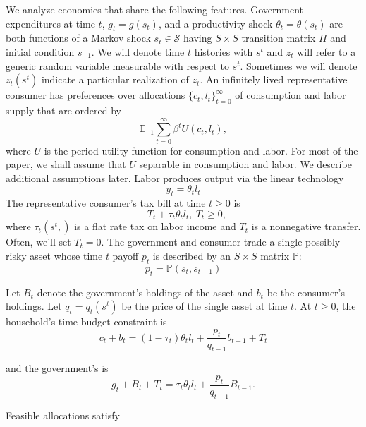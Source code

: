 \documentclass[12pt]{article}
\begin{document}
We analyze economies that share the following features.
Government expenditures at time $t$, $g_t=g(s_t)$, and a productivity shock $\theta_t=\theta(s_t)$ are both functions of
  a Markov  shock $s_t\in \mathcal{S}$ having  $S \times S$ transition matrix $\Pi$ and initial condition $s_{-1}$. We will denote time $t$ histories with $s^t$ and $z_t$ will refer to a generic random variable measurable with respect to $s^t$. Sometimes we will denote $z_t(s^t)$ indicate a particular realization of $z_t$.
 An infinitely lived representative consumer has preferences over allocations  $\{c_t, l_t\}_{t=0}^\infty$ of consumption and labor supply that are ordered
by
   \begin{equation}
   \label{eqn:obj}
\mathbb{E}_{-1}\sum_{t=0}^{\infty } \beta^t  U\left(
c_t,l_t\right),
\end{equation}%
where $U$ is the period utility function for consumption and labor.  For most of the paper,  we shall assume that $U$ separable in consumption and labor.  We describe additional assumptions later.  Labor produces output via the linear technology
  \begin{equation*}
  y_t=\theta_{t} l_{t} \end{equation*}
The representative consumer's tax bill
 at time $t \geq 0$ is
 \[- T_t + \tau_t \theta_{t}l_{t},  \ T_t \geq 0, \]
 where $\tau_t(s^t,)$ is a flat rate tax on labor income and $T_t$ is a nonnegative transfer.
 Often, we'll set $T_t =0$.
The government and consumer trade a single  possibly risky  asset whose  time $t$ payoff $p_t$ is described by an $S \times S$ matrix $\mathbb{P}$:
\[p_t=\mathbb{P}(s_{t},s_{t-1}) \]

Let $B_t$ denote the government's holdings of the asset and $b_t$ be the consumer's holdings.
Let $q_t= q_t(s^t)$ be the price of the single  asset at time $t$.
 At $t \geq 0$, the household's time budget constraint is
 \begin{equation}
 \label{eqn:HHbudget}
 c_{t}+b_{t}=\left( 1-\tau _{t}\right) \theta _{t}l_{t}+\frac{p_{t}}{q_{t-1}}b_{t-1}+T_{t}
 \end{equation}

 and the government's is
 \begin{equation}
 \label{eqn:Govbudget}
g_{t}+B_{t}+T_t=\tau _{t}\theta_{t}l_{t}+\frac{p_{t}}{q_{t-1}}B_{t-1}.
 \end{equation}


Feasible allocations satisfy
\end{document}
